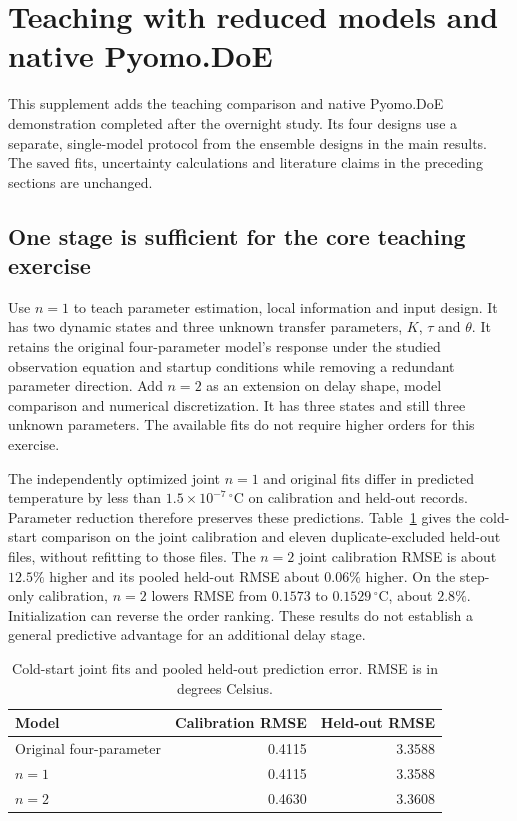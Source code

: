 \documentclass[11pt]{article}
\begin{document}

\clearpage

\section{Teaching with reduced models and native Pyomo.DoE}
\label{sec:teaching-doe}
This supplement adds the teaching comparison and native Pyomo.DoE demonstration
completed after the overnight study. Its four designs use a separate,
single-model protocol from the ensemble designs in the main results. The saved
fits, uncertainty calculations and literature claims in the preceding sections
are unchanged.

\subsection{One stage is sufficient for the core teaching exercise}
Use $n=1$ to teach parameter estimation, local information and input design.
It has two dynamic states and three unknown transfer parameters, $K$, $\tau$
and $\theta$. It retains the original four-parameter model's response under the
studied observation equation and startup conditions while removing a redundant
parameter direction. Add $n=2$ as an extension on delay shape, model comparison
and numerical discretization. It has three states and still three unknown
parameters. The available fits do not require higher orders for this exercise.

The independently optimized joint $n=1$ and original fits differ in predicted
temperature by less than $1.5\times10^{-7}\,{}^\circ\mathrm C$ on calibration
and held-out records. Parameter reduction therefore preserves these predictions.
Table~\ref{tab:teaching-prediction} gives the cold-start comparison on the joint
calibration and eleven duplicate-excluded held-out files, without refitting
to those files. The $n=2$ joint calibration RMSE is about $12.5\%$ higher and
its pooled held-out RMSE about $0.06\%$ higher. On the step-only calibration,
$n=2$ lowers RMSE from $0.1573$ to $0.1529\,{}^\circ\mathrm C$, about $2.8\%$.
Initialization can reverse the order ranking. These results do not establish a
general predictive advantage for an additional delay stage.

\begin{table}[htbp]
\centering
\small
\caption{Cold-start joint fits and pooled held-out prediction error. RMSE is in degrees Celsius.}
\label{tab:teaching-prediction}
\begin{tabular}{lrr}
\toprule
Model & Calibration RMSE & Held-out RMSE \\
\midrule
Original four-parameter & 0.4115 & 3.3588 \\
$n=1$ & 0.4115 & 3.3588 \\
$n=2$ & 0.4630 & 3.3608 \\
\bottomrule
\end{tabular}
\end{table}
\end{document}
